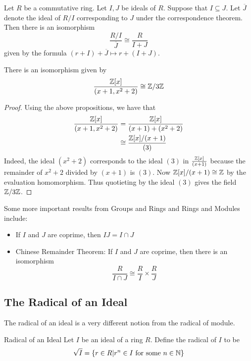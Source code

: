 \documentclass[a4paper]{article}
\begin{document}
\begin{prp}{}{} Let $R$ be a commutative ring. Let $I,J$ be ideals of $R$. Suppose that $I\subseteq J$. Let $\overline{J}$ denote the ideal of $R/I$ corresponding to $J$ under the correspondence theorem. Then there is an isomorphism $$\frac{R/I}{\overline{J}}\cong\frac{R}{I+J}$$ given by the formula $(r+I)+\overline{J}\mapsto r+(I+J)$. 
\end{prp}

\begin{eg}{}{} There is an isomorphism given by $$\frac{\mathbb{Z}[x]}{(x+1,x^2+2)}\cong\mathbb{Z}/3\mathbb{Z}$$ \tcbline
\begin{proof}
Using the above propositions, we have that 
\begin{align*}
\frac{\mathbb{Z}[x]}{(x+1,x^2+2)}&=\frac{\mathbb{Z}[x]}{(x+1)+(x^2+2)}\\
&\cong\frac{\mathbb{Z}[x]/(x+1)}{(3)}
\end{align*}
Indeed, the ideal $(x^2+2)$ corresponds to the ideal $(3)$ in $\frac{\mathbb{Z}[x]}{(x+1)}$ because the remainder of $x^2+2$ divided by $(x+1)$ is $(3)$. Now $\mathbb{Z}[x]/(x+1)\cong\mathbb{Z}$ by the evaluation homomorphism. Thus quotieting by the ideal $(3)$ gives the field $\mathbb{Z}/3\mathbb{Z}$. 
\end{proof}
\end{eg}

Some more important results from Groups and Rings and Rings and Modules include: 
\begin{itemize}
\item If $I$ and $J$ are coprime, then $IJ=I\cap J$
\item Chinese Remainder Theorem: If $I$ and $J$ are coprime, then there is an isomorphism $$\frac{R}{I\cap J}\cong\frac{R}{I}\times\frac{R}{J}$$
\end{itemize}

\subsection{The Radical of an Ideal}
The radical of an ideal is a very different notion from the radical of module. 

\begin{defn}{Radical of an Ideal}{} Let $I$ be an ideal of a ring $R$. Define the radical of $I$ to be $$\sqrt{I}=\{r\in R|r^n\in I\text{ for some }n\in\mathbb{N}\}$$
\end{defn}
\end{document}
